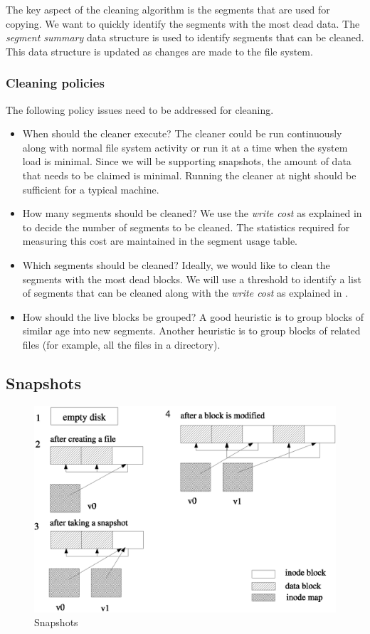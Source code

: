 \documentclass{article}
\begin{document}
The key aspect of the cleaning algorithm is the segments that are used for
copying. We want to quickly identify the segments with the most dead data.
The \textit{segment summary} data structure is used to identify segments that
can be cleaned. This data structure is updated as changes are made to the file
system.

\subsubsection{Cleaning policies}
The following policy issues need to be addressed for cleaning.
\begin{itemize}
\item
When should the cleaner execute? The cleaner could be run continuously along
with normal file system activity or run it at a time when the system load is
minimal. Since we will be supporting snapshots, the amount of data that needs
to be claimed is minimal. Running the cleaner at night should be sufficient
for a typical machine.
\item
How many segments should be cleaned? We use the \textit{write cost} as
explained in \cite{Rosenblum91} to decide the number of segments to be
cleaned. The statistics required for measuring this cost are maintained in the
segment usage table.
\item
Which segments should be cleaned? Ideally, we would like to clean the segments
with the most dead blocks. We will use a threshold to identify a list of
segments that can be cleaned along with the \textit{write cost} as explained in
\cite{Rosenblum91}.
\item
How should the live blocks be grouped? A good heuristic is to group blocks of
similar age into new segments. Another heuristic is to group blocks of related
files (for example, all the files in a directory).
\end{itemize}

\subsection{Snapshots}

\begin{figure}
\centering
\includegraphics[scale=0.6]{lfs4}
\caption{Snapshots}
\label{snap}
\end{figure}
\end{document}
